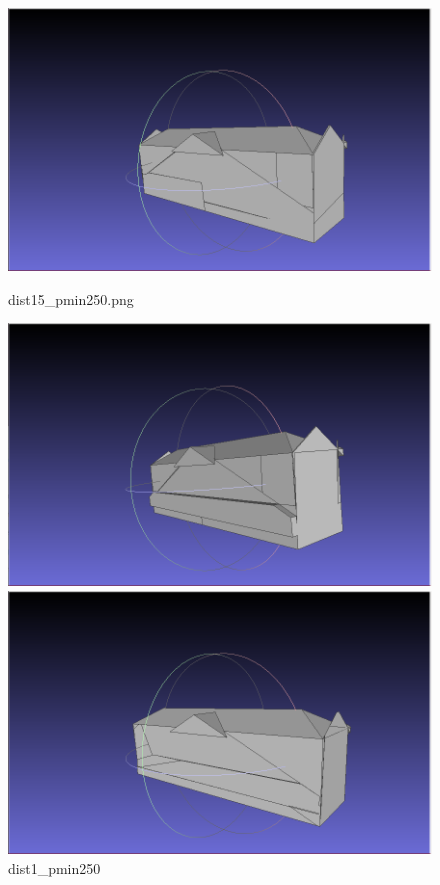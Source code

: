\documentclass{article}
\begin{document}
\begin{itemize}
  \begin{figure}[H]
    \centering
    \begin{minipage}[b]{0.45\textwidth}
      \includegraphics[width=\textwidth]{../../images/screen_kinetic/dist1_5_pmin_250.png}
      \caption{dist15\_pmin250.png}
      \label{fig:dist15_pmin220}
    \end{minipage}
    \hfill
    \begin{minipage}[b]{0.45\textwidth}
      \includegraphics[width=\textwidth]{../../images/screen_kinetic/dist1_pmin250.png}
      \caption{dist1\_pmin250}
      \label{fig:dist1_pmin250}
    \end{minipage}
    \hfill
    \begin{minipage}[b]{0.45\textwidth}
      \includegraphics[width=\textwidth]{../../images/screen_kinetic/dist_0_3_pmin_250.png}

\end{minipage}
\end{figure}
\end{itemize}
\end{document}
